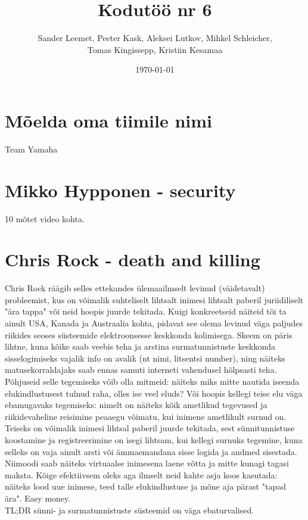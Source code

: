 \documentclass{article}
\title{Kodutöö nr 6}
\author{Sander Leemet, Peeter Kask, Aleksei Lutkov, Mihkel Schleicher,\\ Tomas Kingissepp, Kristiin Kesamaa}
\date{\today}
\begin{document}
\maketitle

\section{Mõelda oma tiimile nimi}
Team Yamaha

\section{Mikko Hypponen - security}
10 mõtet video kohta.

\section{Chris Rock - death and killing}
Chris Rock räägib selles ettekandes ülemaailmselt levinud (väidetavalt) probleemist, 
kus on võimalik suhteliselt lihtsalt inimesi lihtsalt paberil juriidiliselt "ära tappa" või neid hoopis juurde tekitada. 
Kuigi konkreetseid näiteid tõi ta ainult USA, Kanada ja Austraalia kohta, pidavat see olema levinud väga paljudes riikides 
seoses süsteemide elektroonsesse keskkonda kolimisega. Skeem on päris lihtne, kuna kõike saab veebis teha ja 
arstina surmatunnistuste keskkonda sisselogimiseks vajalik info on avalik (nt nimi, litsentsi number), ning näiteks 
matusekorraldajaks saab ennas samuti interneti vahendusel hõlpsasti teha. Põhjuseid selle tegemiseks võib olla mitmeid: 
näiteks miks mitte nautida iseenda elukindlustusest tulnud raha, olles ise veel eluds? Või hoopis kellegi teise elu väga ebamugavaks 
tegemiseks: nimelt on näiteks kõik ametlikud tegevused ja riikidevaheline reisimine peaaegu võimatu, kui inimene ametlikult surnud on. 
Teiseks on võimalik inimesi lihtsal paberil juurde tekitada, sest sünnitunnistuse koostamine ja registreerimine on isegi lihtsam, 
kui kellegi surnuks tegemine, kuna selleks on vaja ainult arsti või ämmaemandana sisse logida ja andmed sisestada. 
Niimoodi saab näiteks virtuaalse inimesena laene võtta ja mitte kunagi tagasi maksta. Kõige efektiivsem oleks aga ilmselt neid kahte asja koos kasutada: 
näiteks lood uue inimese, teed talle elukindlustuse ja mõne aja pärast "tapad ära". Easy money.\\
TL;DR sünni- ja surmatunnistuste süsteemid on väga ebaturvalised.
\end{document}
